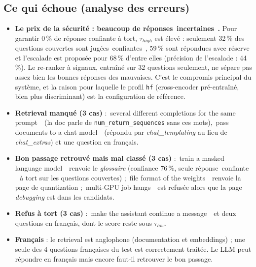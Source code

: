 \documentclass[11pt,a4paper]{article}
\providecommand{\og}{\guillemotleft\,}\providecommand{\fg}{\,\guillemotright}
\newcommand{\code}[1]{\texttt{\small #1}}
\begin{document}
\subsection{Ce qui \'echoue (analyse des erreurs)}
\TabFailures
\begin{itemize}[leftmargin=*,itemsep=2pt]
\item \textbf{Le prix de la s\'ecurit\'e : beaucoup de r\'eponses \og incertaines \fg.} Pour garantir 0\,\% de r\'eponse confiante \`a tort, $\tau_{high}$ est \'elev\'e : seulement 32\,\% des questions couvertes sont jug\'ees \og confiantes \fg, 59\,\% sont r\'epondues avec r\'eserve et l'escalade est propos\'ee pour 68\,\% d'entre elles (pr\'ecision de l'escalade : 44\,\%). Le re-ranker \`a signaux, entra\^in\'e sur 32 questions seulement, ne s\'epare pas assez bien les bonnes r\'eponses des mauvaises. C'est le compromis principal du syst\`eme, et la raison pour laquelle le profil \code{hf} (cross-encoder pr\'e-entra\^in\'e, bien plus discriminant) est la configuration de r\'ef\'erence.
\item \textbf{Retrieval manqu\'e (3 cas)} : \og several different completions for the same prompt \fg\ (la doc parle de \code{num\_return\_sequences} sans ces mots), \og pass documents to a chat model \fg\ (r\'epondu par \emph{chat\_templating} au lieu de \emph{chat\_extras}) et une question en fran\c cais.
\item \textbf{Bon passage retrouv\'e mais mal class\'e (3 cas)} : \og train a masked language model \fg\ renvoie le \emph{glossaire} (confiance 76\,\%, seule r\'eponse \og confiante \fg\ \`a tort sur les questions couvertes) ; \og file format of the weights \fg\ renvoie la page de quantization ; \og multi-GPU job hangs \fg\ est refus\'ee alors que la page \emph{debugging} est dans les candidats.
\item \textbf{Refus \`a tort (3 cas)} : \og make the assistant continue a message \fg\ et deux questions en fran\c cais, dont le score reste sous $\tau_{low}$.
\item \textbf{Fran\c cais} : le retrieval est anglophone (documentation et embeddings) ; une seule des 4 questions fran\c caises du test est correctement trait\'ee. Le LLM peut r\'epondre en fran\c cais mais encore faut-il retrouver le bon passage.
\end{itemize}
\end{document}
